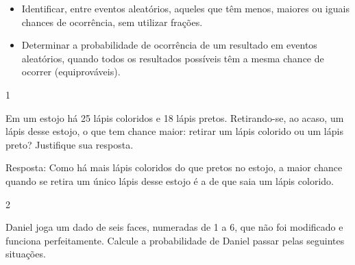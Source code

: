\begin{multicols}{2}
{\begin{escolha}

\begin{itemize}
    \item Identificar, entre eventos aleatórios, aqueles que têm menos, maiores ou
iguais chances de ocorrência, sem utilizar frações.

    \item Determinar a probabilidade de ocorrência de um resultado em eventos
aleatórios, quando todos os resultados possíveis têm a mesma chance de
ocorrer (equiprováveis).
\end{itemize}




\num{1}

Em um estojo há 25 lápis coloridos e 18 lápis pretos. Retirando-se, ao
acaso, um lápis desse estojo, o que tem chance maior: retirar um lápis
colorido ou um lápis preto? Justifique sua resposta.


Resposta:
Como há mais lápis coloridos do que pretos no estojo, a maior chance
quando se retira um único lápis desse estojo é a de que saia um lápis
colorido.


\num{2}

Daniel joga um dado de seis faces, numeradas de 1 a 6, que não foi modificado e funciona perfeitamente. Calcule a probabilidade de Daniel passar pelas seguintes situações.

\begin{escolha}


\end{escolha}
\end{escolha}}
\end{multicols}

